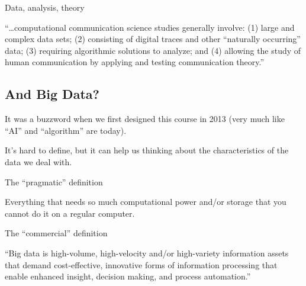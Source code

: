 \begin{frame}{Data, analysis, theory}
	\begin{block}{\textcite{VanAtteveldt2018a}}
		``\ldots computational communication science studies generally involve: (1) large and complex data sets; (2) consisting of digital traces and other ``naturally occurring'' data; (3) requiring algorithmic solutions to analyze; and (4) allowing the study of human communication by applying and testing communication theory.''
	\end{block}	
	
\end{frame}





\subsection{And Big Data?}

\begin{frame}[standout]
It was a buzzword when we first designed this course in 2013 (very much like ``AI'' and ``algorithm'' are today).

It's hard to define, but it can help us thinking about the characteristics of the data we deal with.
\end{frame}


\begin{frame}{The ``pragmatic'' definition }
	\begin{block}{}
		Everything that needs so much computational power and/or storage that you cannot do it on a regular computer.
	\end{block}
\end{frame}



\begin{frame}{The ``commercial'' definition }
	\begin{block}{\textcite{gartner}}
		``Big data is high-volume, high-velocity and/or high-variety information assets that demand cost-effective, innovative forms of information processing that enable enhanced insight, decision making, and process automation.''
	\end{block}
\end{frame}



